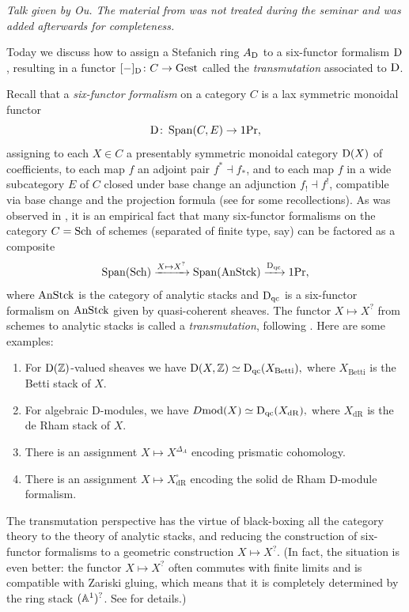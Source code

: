 \documentclass[11pt]{book}
\begin{document}
	\emph{Talk given by Ou. The material from  was not treated during the seminar and was added afterwards for completeness.}

	Today we discuss how to assign a Stefanich ring $A_{\operatorname{\mathrm{D}}}$ to a six-functor formalism $\operatorname{\mathrm{D}}$, resulting in a functor $[-]_{\operatorname{\mathrm{D}}}\colon C \to {\textup{Gest}}$ called the \emph{transmutation} associated to $\operatorname{\mathrm{D}}$.

	Recall that a \emph{six-functor formalism} on a category $C$ is a lax symmetric monoidal functor
	\[
		\operatorname{\mathrm{D}}\colon \operatorname{Span}(C, E) \to 1\textup{Pr},
	\]
	assigning to each $X \in C$ a presentably symmetric monoidal category $\operatorname{\mathrm{D}}(X)$ of coefficients, to each map $f$ an adjoint pair $f^* \dashv f_*$, and to each map $f$ in a wide subcategory $E$ of $C$ closed under base change an adjunction $f_! \dashv f^!$, compatible via base change and the projection formula (see  for some recollections). As was observed in \citep[Lecture~X]{Scholze_Six_Functors}, it is an empirical fact that many six-functor formalisms on the category $C = \operatorname{Sch}$ of schemes (separated of finite type, say) can be factored as a composite
	\[
		\operatorname{Span}(\operatorname{Sch}) \xrightarrow{X \mapsto X^{?}} \operatorname{Span}({\textup{AnStck}}) \xrightarrow{\operatorname{\mathrm{D}}_{\operatorname{qc}}} 1\textup{Pr},
	\]
	where ${\textup{AnStck}}$ is the category of analytic stacks and $\operatorname{\mathrm{D}}_{\operatorname{qc}}$ is a six-functor formalism on ${\textup{AnStck}}$ given by quasi-coherent sheaves. The functor $X \mapsto X^{?}$ from schemes to analytic stacks is called a \emph{transmutation}, following \citep[Remark~2.3.8]{Bhatt2022FGauges}. Here are some examples:
	
	\begin{enumerate}
		\item For $\operatorname{\mathrm{D}}(\operatorname{\mathbb Z})$-valued sheaves we have $\operatorname{\mathrm{D}}(X,\operatorname{\mathbb Z}) \simeq \operatorname{\mathrm{D}}_{\operatorname{qc}}(X_{\mathrm{Betti}}),$ where $X_{\mathrm{Betti}}$ is the Betti stack of $X$.
		\item For algebraic D-modules, we have $D\mathrm{mod}(X) \simeq \operatorname{\mathrm{D}}_{\operatorname{qc}}(X_{\mathrm{dR}}),$ where $X_{\mathrm{dR}}$ is the de Rham stack of $X$.
		\item There is an assignment $X \mapsto X^{\Delta_A}$ encoding prismatic cohomology.
		\item There is an assignment $X \mapsto X^{\square}_{\mathrm{dR}}$ encoding the solid de Rham D-module formalism.
	\end{enumerate}
	
	The transmutation perspective has the virtue of black-boxing all the category theory to the theory of analytic stacks, and reducing the construction of six-functor formalisms to a geometric construction $X \mapsto X^{?}$. (In fact, the situation is even better: the functor $X \mapsto X^{?}$ often commutes with finite limits and is compatible with Zariski gluing, which means that it is completely determined by the ring stack $(\mathbb{A}^1)^{?}$. See  for details.)
\end{document}
